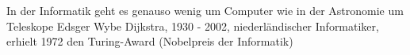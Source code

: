{In der Informatik geht es genauso wenig um Computer wie in der Astronomie um Teleskope}
{Edsger Wybe Dijkstra, 1930 - 2002, niederländischer Informatiker, erhielt 1972 den Turing-Award (Nobelpreis der Informatik)}




